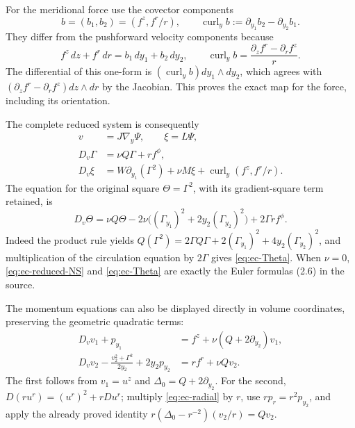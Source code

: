 For the meridional force use the covector components
\begin{equation}
 b=(b_1,b_2)=(f^z,f^r/r),\qquad
 \operatorname{curl}_y b:=\partial_{y_1}b_2-\partial_{y_2}b_1.
 \label{eq:ec-force-covector}
\end{equation}
They differ from the pushforward velocity components because
\[
 f^z\,dz+f^r\,dr=b_1\,dy_1+b_2\,dy_2,
 \qquad
 \operatorname{curl}_yb
       =\frac{\partial_zf^r-\partial_rf^z}{r}.
\]
The differential of this one-form is
\((\operatorname{curl}_yb)dy_1\wedge dy_2\), which agrees with
\((\partial_zf^r-\partial_rf^z)dz\wedge dr\) by the Jacobian.
This proves the exact map for the force, including its orientation.

The complete reduced system is consequently
\begin{equation}
 \boxed{\begin{aligned}
    v&=J\nabla_y\Psi,\qquad \xi=L\Psi,\\
    D_v\Gamma&=\nu Q\Gamma+rf^\phi,\\
    D_v\xi&=W\partial_{y_1}(\Gamma^2)+\nu M\xi
                          +\operatorname{curl}_y(f^z,f^r/r).
 \end{aligned}}
 \label{eq:ec-reduced-NS}
\end{equation}
The equation for the original square \(\Theta=\Gamma^2\), with its
gradient-square term retained, is
\begin{equation}
 D_v\Theta=\nu Q\Theta
 -2\nu\bigl((\Gamma_{y_1})^2+2y_2(\Gamma_{y_2})^2\bigr)
 +2\Gamma r f^\phi.
 \label{eq:ec-Theta}
\end{equation}
Indeed the product rule yields
\(Q(\Gamma^2)=2\Gamma Q\Gamma
+2(\Gamma_{y_1})^2+4y_2(\Gamma_{y_2})^2\), and multiplication of the
circulation equation by \(2\Gamma\) gives \eqref{eq:ec-Theta}.
When \(\nu=0\), \eqref{eq:ec-reduced-NS} and
\eqref{eq:ec-Theta} are exactly the Euler formulas (2.6) in the source.

The momentum equations can also be displayed directly in volume
coordinates, preserving the geometric quadratic terms:
\begin{align}
 D_vv_1+p_{y_1}&=f^z+\nu(Q+2\partial_{y_2})v_1,\label{eq:ec-v1}\\
 D_vv_2-\frac{v_2^2+\Gamma^2}{2y_2}+2y_2p_{y_2}
      &=rf^r+\nu Qv_2.\label{eq:ec-v2}
\end{align}
The first follows from \(v_1=u^z\) and
\(\Delta_0=Q+2\partial_{y_2}\).  For the second,
\(D(r u^r)=(u^r)^2+rDu^r\); multiply
\eqref{eq:ec-radial} by \(r\), use \(r p_r=r^2p_{y_2}\),
and apply the already proved identity
\(r(\Delta_0-r^{-2})(v_2/r)=Qv_2\).

